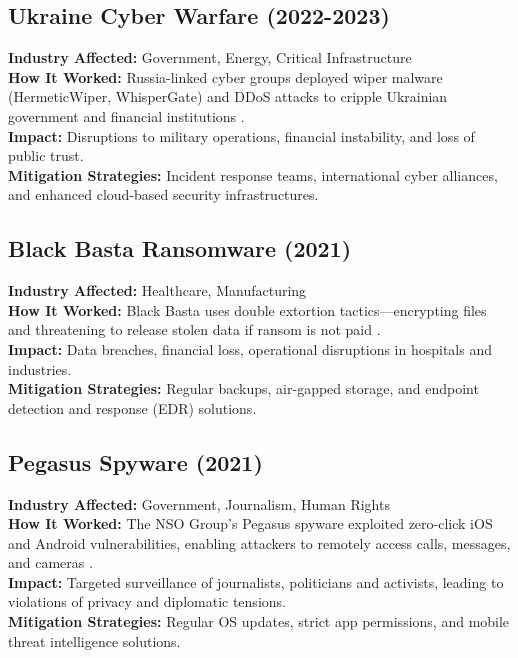 \documentclass[a4paper,12pt]{article}
\begin{document}
\subsection{Ukraine Cyber Warfare (2022-2023)}
\textbf{Industry Affected:} Government, Energy, Critical Infrastructure \\
\textbf{How It Worked:} Russia-linked cyber groups deployed wiper malware (HermeticWiper, WhisperGate) and DDoS attacks to cripple Ukrainian government and financial institutions \cite{ukraine2023}.\\
\textbf{Impact:} Disruptions to military operations, financial instability, and loss of public trust.\\
\textbf{Mitigation Strategies:} Incident response teams, international cyber alliances, and enhanced cloud-based security infrastructures.





\subsection{Black Basta Ransomware (2021)}
\textbf{Industry Affected:} Healthcare, Manufacturing \\
\textbf{How It Worked:} Black Basta uses double extortion tactics—encrypting files and threatening to release stolen data if ransom is not paid \cite{blackbasta2022}.\\
\textbf{Impact:} Data breaches, financial loss, operational disruptions in hospitals and industries.\\
\textbf{Mitigation Strategies:} Regular backups, air-gapped storage, and endpoint detection and response (EDR) solutions.

\subsection{Pegasus Spyware (2021)}
\textbf{Industry Affected:} Government, Journalism, Human Rights \\
\textbf{How It Worked:} The NSO Group's Pegasus spyware exploited zero-click iOS and Android vulnerabilities, enabling attackers to remotely access calls, messages, and cameras \cite{pegasus2021}.\\
\textbf{Impact:} Targeted surveillance of journalists, politicians and activists, leading to violations of privacy and diplomatic tensions.\\
\textbf{Mitigation Strategies:} Regular OS updates, strict app permissions, and mobile threat intelligence solutions.
\end{document}
